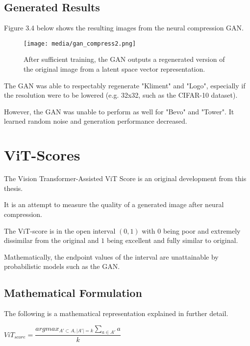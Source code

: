 \subsection{Generated Results}

Figure 3.4 below shows the resulting images from the neural compression GAN.

\begin{figure}[H]
	\begin{center}
	\texttt{[image: media/gan\_compress2.png]}
	\end{center}
	\caption[Neural Compression and Generation]{After sufficient training, the GAN outputs a regenerated
    version of the original image from a latent space vector representation.}
	\end{figure}

The GAN was able to respectably regenerate "Kliment" and "Logo", especially if the resolution
were to be lowered (e.g. 32x32, such as the CIFAR-10 dataset).

However, the GAN was unable to perform as well for "Bevo" and "Tower".
It learned random noise and generation performance decreased.

\section{ViT-Scores}

The Vision Transformer-Assisted ViT Score is an original development from this thesis. 

It is an attempt to measure the quality of a generated image after neural compression.

The ViT-score is in the open interval $(0,1)$ with $0$ being poor and extremely dissimilar from
the original and $1$ being excellent and fully similar to original.

Mathematically, the endpoint values of the interval are unattainable by probabilistic models
such as the GAN.

\subsection{Mathematical Formulation}

The following is a mathematical representation explained in further detail.

\begin{center}
    $ViT_{score} = \displaystyle\dfrac{argmax_{A'\subset A,\lvert A' \rvert = k } \sum_{a \in A'} {a} }{k} $
\end{center}


